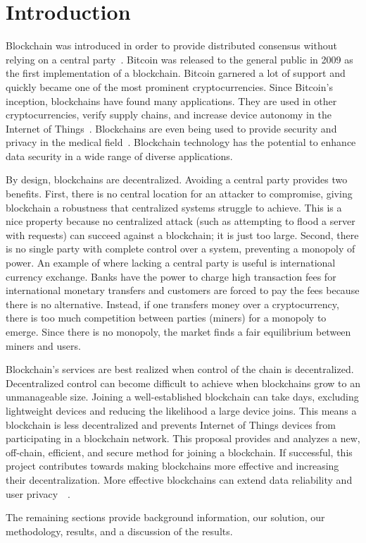 \section{Introduction}
\label{sec:introduction}



Blockchain was introduced in order to provide distributed consensus without relying on a central party~\cite{nakamoto2009Bitcoin}.
Bitcoin was released to the general public in 2009 as the first implementation of a blockchain.
Bitcoin garnered a lot of support and quickly became one of the most prominent cryptocurrencies.
Since Bitcoin's inception, blockchains have found many applications.
They are used in other cryptocurrencies, verify supply chains, and increase device autonomy in the Internet of Things~\cite{cai2018DecentralizedApplications}.
Blockchains are even being used to provide security and privacy in the medical field~\cite{siyal2019MedicalApplications}.
Blockchain technology has the potential to enhance data security in a wide range of diverse applications.

By design, blockchains are decentralized.
Avoiding a central party provides two benefits.
First, there is no central location for an attacker to compromise, giving blockchain a robustness that centralized systems struggle to achieve.
This is a nice property because no centralized attack (such as attempting to flood a server with requests) can succeed against a blockchain; it is just too large.
Second, there is no single party with complete control over a system, preventing a monopoly of power.
An example of where lacking a central party is useful is international currency exchange.
Banks have the power to charge high transaction fees for international monetary transfers and customers are forced to pay the fees because there is no alternative.
Instead, if one transfers money over a cryptocurrency, there is too much competition between parties (miners) for a monopoly to emerge.
Since there is no monopoly, the market finds a fair equilibrium between miners and users.

Blockchain’s services are best realized when control of the chain is decentralized.
Decentralized control can become difficult to achieve when blockchains grow to an unmanageable size.
Joining a well-established blockchain can take days, excluding lightweight devices and reducing the likelihood a large device joins.
This means a blockchain is less decentralized and prevents Internet of Things devices from participating in a blockchain network.
This proposal provides and analyzes a new, off-chain, efficient, and secure method for joining a blockchain.
If successful, this project contributes towards making blockchains more effective and increasing their decentralization.
More effective blockchains can extend data reliability and user privacy~\cite{cai2018DecentralizedApplications}~\cite{siyal2019MedicalApplications}.

The remaining sections provide background information, our solution, our methodology, results, and a discussion of the results.
